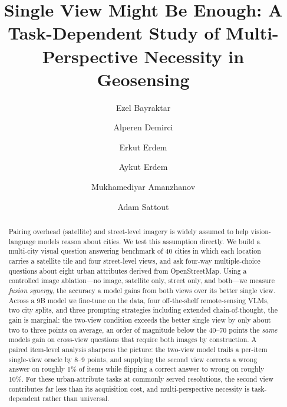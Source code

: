 \documentclass[runningheads]{llncs}
\begin{document}
\title{Single View Might Be Enough: A Task-Dependent Study of Multi-Perspective Necessity in Geosensing}


\author{Ezel Bayraktar \and
Alperen Demirci \and
Erkut Erdem \and
Aykut Erdem \and
Mukhamediyar Amanzhanov \and
Adam Sattout}

\maketitle

\begin{abstract}
Pairing overhead (satellite) and street-level imagery is widely assumed to help
vision-language models reason about cities. We test this assumption directly. We
build a multi-city visual question answering benchmark of \num{40} cities in
which each location carries a satellite tile and four street-level views, and
ask four-way multiple-choice questions about eight urban attributes derived from
OpenStreetMap. Using a controlled image ablation---no image, satellite only,
street only, and both---we measure \emph{fusion synergy}, the accuracy a model
gains from both views over its better single view. Across a \num{9}B model we
fine-tune on the data, four off-the-shelf remote-sensing VLMs, two city splits,
and three prompting strategies including extended chain-of-thought, the gain is
marginal: the two-view condition exceeds the better single view by only about
two to three points on average, an order of magnitude below the \num{40}--\num{70}
points the \emph{same} models gain on cross-view questions that require both
images by construction. A paired item-level analysis sharpens the picture: the
two-view model trails a per-item single-view oracle by \num{8}--\num{9} points,
and supplying the second view corrects a wrong answer on roughly \num{1}\% of
items while flipping a correct answer to wrong on roughly \num{10}\%. For these
urban-attribute tasks at commonly served resolutions, the second view contributes
far less than its acquisition cost, and multi-perspective necessity is
task-dependent rather than universal.
\end{abstract}
\end{document}
